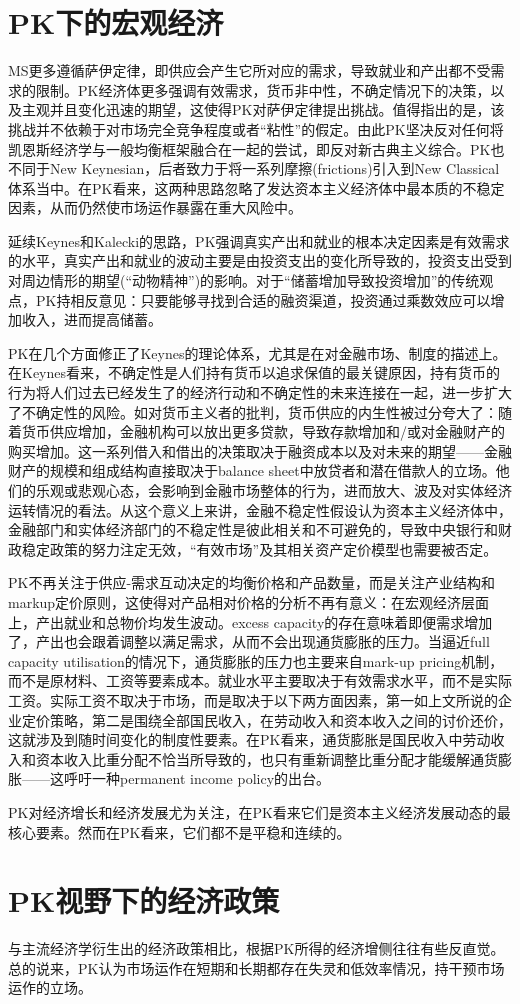 \section{PK下的宏观经济}
\label{sec:PK-macro-economy}
MS更多遵循萨伊定律，即供应会产生它所对应的需求，导致就业和产出都不受需求的限制。PK经济体更多强调有效需求，货币非中性，不确定情况下的决策，以及主观并且变化迅速的期望，这使得PK对萨伊定律提出挑战。值得指出的是，该挑战并不依赖于对市场完全竞争程度或者“粘性”的假定。由此PK坚决反对任何将凯恩斯经济学与一般均衡框架融合在一起的尝试，即反对新古典主义综合。PK也不同于New Keynesian，后者致力于将一系列摩擦(frictions)引入到New Classical体系当中\cite{Akerlof:2007go}。在PK看来，这两种思路忽略了发达资本主义经济体中最本质的不稳定因素，从而仍然使市场运作暴露在重大风险中。

延续Keynes和Kalecki的思路，PK强调真实产出和就业的根本决定因素是有效需求的水平，真实产出和就业的波动主要是由投资支出的变化所导致的，投资支出受到对周边情形的期望(“动物精神”)的影响。对于“储蓄增加导致投资增加”的传统观点，PK持相反意见：只要能够寻找到合适的融资渠道，投资通过乘数效应可以增加收入，进而提高储蓄。

PK在几个方面修正了Keynes的理论体系，尤其是在对金融市场、制度的描述上。在Keynes看来，不确定性是人们持有货币以追求保值的最关键原因，持有货币的行为将人们过去已经发生了的经济行动和不确定性的未来连接在一起，进一步扩大了不确定性的风险。如\cite{Kaldor:1985ve}对货币主义者的批判，货币供应的内生性被过分夸大了：随着货币供应增加，金融机构可以放出更多贷款，导致存款增加和/或对金融财产的购买增加。这一系列借入和借出的决策取决于融资成本以及对未来的期望——金融财产的规模和组成结构直接取决于balance sheet中放贷者和潜在借款人的立场。他们的乐观或悲观心态，会影响到金融市场整体的行为，进而放大、波及对实体经济运转情况的看法。从这个意义上来讲，金融不稳定性假设认为资本主义经济体中，金融部门和实体经济部门的不稳定性是彼此相关和不可避免的\citep{Minsky:2015uq}，导致中央银行和财政稳定政策的努力注定无效，“有效市场”及其相关资产定价模型也需要被否定。

PK不再关注于供应-需求互动决定的均衡价格和产品数量，而是关注产业结构和markup定价原则，这使得对产品相对价格的分析不再有意义：在宏观经济层面上，产出就业和总物价均发生波动。excess capacity的存在意味着即便需求增加了，产出也会跟着调整以满足需求，从而不会出现通货膨胀的压力。当逼近full capacity utilisation的情况下，通货膨胀的压力也主要来自mark-up pricing机制，而不是原材料、工资等要素成本。就业水平主要取决于有效需求水平，而不是实际工资。实际工资不取决于市场，而是取决于以下两方面因素，第一如上文所说的企业定价策略，第二是围绕全部国民收入，在劳动收入和资本收入之间的讨价还价，这就涉及到随时间变化的制度性要素。在PK看来，通货膨胀是国民收入中劳动收入和资本收入比重分配不恰当所导致的，也只有重新调整比重分配才能缓解通货膨胀——这呼吁一种permanent income policy的出台。

PK对经济增长和经济发展尤为关注，在PK看来它们是资本主义经济发展动态的最核心要素。然而在PK看来，它们都不是平稳和连续的。

\section{PK视野下的经济政策}
\label{sec:PK-economic-policy}
与主流经济学衍生出的经济政策相比，根据PK所得的经济增侧往往有些反直觉。总的说来，PK认为市场运作在短期和长期都存在失灵和低效率情况，持干预市场运作的立场。
